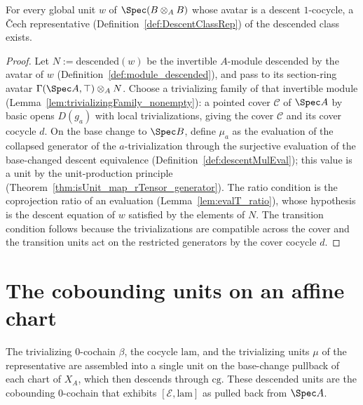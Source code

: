\begin{theorem}
  \label{thm:descentClassRep}
  \leanok
  For every global unit \(w\) of \(\Spec(B \otimes_A B)\) whose avatar is a descent
  \(1\)-cocycle, a \v Cech representative (Definition~\ref{def:DescentClassRep}) of the descended
  class exists.
\end{theorem}
\begin{proof}
  \leanok
  Let \(N := \mathrm{descended}(w)\) be the invertible \(A\)-module descended by the avatar of
  \(w\) (Definition~\ref{def:module_descended}), and pass to its section-ring avatar
  \(\Gamma(\Spec A, \top) \otimes_A N\).  Choose a trivializing family of that invertible module
  (Lemma~\ref{lem:trivializingFamily_nonempty}): a pointed cover \(\mathcal C\) of \(\Spec A\)
  by basic opens \(D(g_a)\) with local trivializations, giving the cover \(\mathcal C\) and its
  cover cocycle \(d\).  On the base change to \(\Spec B\), define \(\mu_a\) as the evaluation of
  the collapsed generator of the \(a\)-trivialization through the surjective evaluation of the
  base-changed descent equivalence (Definition~\ref{def:descentMulEval}); this value is a unit
  by the unit-production principle (Theorem~\ref{thm:isUnit_map_rTensor_generator}).  The ratio
  condition is the coprojection ratio of an evaluation (Lemma~\ref{lem:evalT_ratio}), whose
  hypothesis is the descent equation of \(w\) satisfied by the elements of \(N\).  The
  transition condition follows because the trivializations are compatible across the cover and
  the transition units act on the restricted generators by the cover cocycle \(d\).
\end{proof}

\section{The cobounding units on an affine chart}
\label{sec:kernelCobounding}

The trivializing \(0\)-cochain \(\beta\), the cocycle \(\mathrm{lam}\), and the trivializing
units \(\mu\) of the representative are assembled into a single unit on the base-change pullback
of each chart of \(X_A\), which then descends through \(\mathrm{cg}\).  These descended units are
the cobounding \(0\)-cochain that exhibits \([\mathcal E, \mathrm{lam}]\) as pulled back from
\(\Spec A\).

